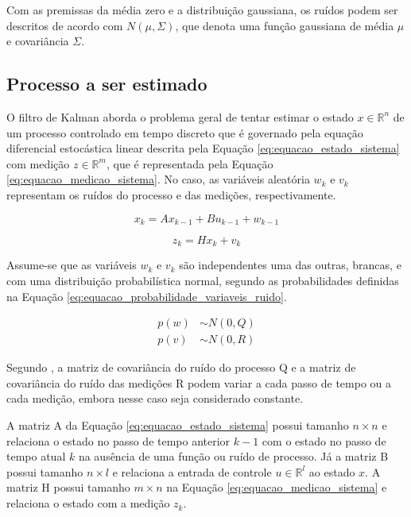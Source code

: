 \documentclass[acronym, symbols, table]{fei}
\begin{document}
				Com as premissas da média zero e a distribuição gaussiana, os ruídos podem ser descritos de acordo com $N(\mu,\Sigma)$, que denota uma função gaussiana de média $\mu$ e covariância $\Sigma$.
		
		\subsection{Processo a ser estimado}
		
			O filtro de Kalman aborda o problema geral de tentar estimar o estado $x \in \mathbb{R}^n$ de um processo controlado em tempo discreto que é governado pela equação diferencial estocástica linear descrita pela Equação \eqref{eq:equacao_estado_sistema} com medição $z \in \mathbb{R}^m$, que é representada pela Equação \eqref{eq:equacao_medicao_sistema}. No caso, as variáveis aleatória $w_k$ e $v_k$ representam os ruídos do processo e das medições, respectivamente.
			
			\begin{equation} \label{eq:equacao_estado_sistema}
				x_k = Ax_{k-1} + Bu_{k-1} + w_{k-1}
			\end{equation}
		
			\begin{equation} \label{eq:equacao_medicao_sistema}
				z_k = Hx_k + v_k
			\end{equation}
		
			Assume-se que as variáveis $w_k$ e $v_k$ são independentes uma das outras, brancas, e com uma distribuição probabilística normal, segundo as probabilidades definidas na Equação \eqref{eq:equacao_probabilidade_variaveis_ruido}.
			
			\begin{equation} \label{eq:equacao_probabilidade_variaveis_ruido}
				\begin{split}
					p(w) &\sim N(0, Q) \\
					p(v) &\sim N(0, R)
				\end{split}
			\end{equation}
		
			Segundo \textcite{welch1995introduction}, a matriz de covariância do ruído do processo Q e a matriz de covariância do ruído das medições R podem variar a cada passo de tempo ou a cada medição, embora nesse caso seja considerado constante.
			
			A matriz A da Equação \eqref{eq:equacao_estado_sistema} possui tamanho $n \times n$ e relaciona o estado no passo de tempo anterior $k - 1$ com o estado no passo de tempo atual $k$ na ausência de uma função ou ruído de processo. Já a matriz B possui tamanho $n \times l$ e relaciona a entrada de controle $u \in \mathbb{R}^l$ ao estado $x$. A matriz H possui tamanho $m \times n$ na Equação \eqref{eq:equacao_medicao_sistema} e relaciona o estado com a medição $z_k$.
			
\end{document}
